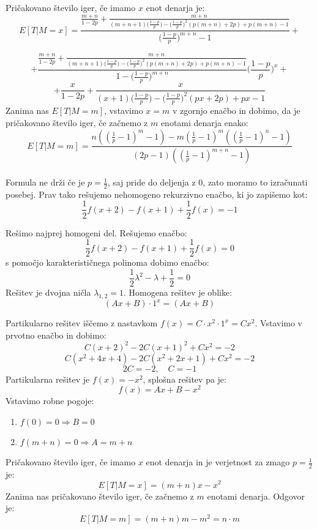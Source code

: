 \documentclass[12pt, a4paper]{article}
\begin{document}
Pričakovano število iger, če imamo $x$ enot denarja je: $$E[ T | M = x]= \frac{\frac{m+n}{1-2p}+\frac{m+n}{(m+n+1)\big( \frac{1-p}{p} \big )-\big( \frac{1-p}{p} \big )^2(p(m+n)+2p)+p(m+n)-1}}{\big( \frac{1-p}{p} \big )^{m+n}-1}+$$

 $$+\frac{\frac{m+n}{1-2p}+\frac{m+n}{(m+n+1)\big( \frac{1-p}{p} \big )-\big( \frac{1-p}{p} \big )^2(p(m+n)+2p)+p(m+n)-1}}{1-\big( \frac{1-p}{p} \big )^{m+n}}\big( \frac{1-p}{p} \big )^x+$$ $$+\frac{x}{1-2p}+\frac{x}{(x+1)\big( \frac{1-p}{p} \big )-\big( \frac{1-p}{p} \big )^2(px+2p)+px-1}$$
 Zanima nas $E[T|M=m]$, vstavimo $x=m$ v zgornjo enačbo in dobimo, da je pričakovano število iger, če začnemo z $m$ enotami denarja enako: $$E[T|M=m]=\frac{n \left(\left(\frac{1}{p}-1\right)^m-1\right)-m \left(\frac{1}{p}-1\right)^m
   \left(\left(\frac{1}{p}-1\right)^n-1\right)}{(2 p-1)
   \left(\left(\frac{1}{p}-1\right)^{m+n}-1\right)}$$
 \\
 Formula ne drži če je $p = \frac{1}{2}$, saj pride do deljenja z 0, zato moramo to izračunati posebej. Prav tako rešujemo nehomogeno rekurzivno enačbo, ki jo zapišemo kot: $$\frac{1}{2}f(x+2)-f(x+1)+\frac{1}{2}f(x)=-1$$

Rešimo najprej homogeni del. Rešujemo enačbo: $$\frac{1}{2}f(x+2)-f(x+1)+\frac{1}{2}f(x)=0$$ s pomočjo karakterističnega polinoma dobimo enačbo: $$\frac{1}{2}\lambda^2-\lambda+\frac{1}{2}=0$$ Rešitev je dvojna ničla $\lambda_{1, 2}= 1$. Homogena rešitev je oblike: $$(Ax+B)\cdot 1^x=(Ax+B)$$

Partikularno rešitev iščemo z nastavkom $f(x)=C\cdot x^2\cdot 1^x= Cx^2$. Vstavimo v prvotno enačbo in dobimo:
$$C(x+2)^2-2C(x+1)^2+Cx^2=-2$$
$$C(x^2+4x+4)-2C(x^2+2x+1)+Cx^2=-2$$
$$2C=-2, \quad C = -1 $$ Partikularna rešitev je $f(x)=-x^2$, splošna rešitev pa je: $$f(x)=Ax+B-x^2$$
Vstavimo robne pogoje:
\begin{enumerate}
\item $f(0)=0\Rightarrow B = 0$
\item $f(m+n)=0 \Rightarrow A = m+n$
\end{enumerate}
Pričakovano število iger, če imamo $x$ enot denarja in je verjetnost za zmago $p=\frac{1}{2}$ je: $$E[T|M=x]= (m+n)x-x^2$$
Zanima nas pričakovano število iger, če začnemo z $m$ enotami denarja. Odgovor je:$$E[T|M=m]=(m+n)m-m^2= n\cdot m$$
\end{document}
